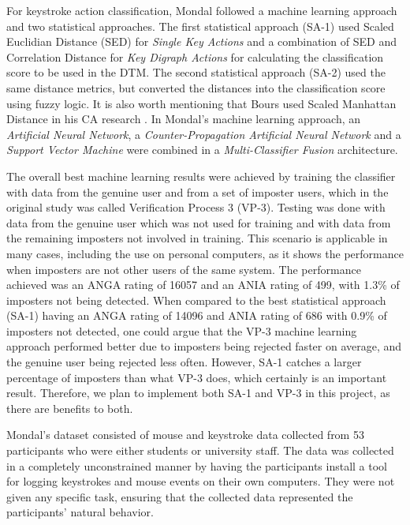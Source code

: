 \documentclass[informationsecurity]{gucmasterproject}
\begin{document}
For keystroke action classification, Mondal followed a machine learning approach and two statistical approaches.
The first statistical approach (SA-1) used Scaled Euclidian Distance (SED) for \textit{Single Key Actions} and a combination of SED and Correlation Distance for \textit{Key Digraph Actions} for calculating the classification score to be used in the DTM. 
The second statistical approach (SA-2) used the same distance metrics, but converted the distances into the classification score using fuzzy logic.
It is also worth mentioning that Bours used Scaled Manhattan Distance in his CA research \cite{BOURS201236}.
In Mondal's \cite{mondal} machine learning approach, an \textit{Artificial Neural Network}, a \textit{Counter-Propagation Artificial Neural Network} and a \textit{Support Vector Machine} were combined in a \textit{Multi-Classifier Fusion} architecture. 

The overall best machine learning results were achieved by training the classifier with data from the genuine user and from a set of imposter users, which in the original study \cite{mondal} was called Verification Process 3 (VP-3).
Testing was done with data from the genuine user which was not used for training and with data from the remaining imposters not involved in training.
This scenario is applicable in many cases, including the use on personal computers, as it shows the performance when imposters are not other users of the same system.
The performance achieved was an ANGA rating of 16057 and an ANIA rating of 499, with 1.3\% of imposters not being detected.
When compared to the best statistical approach (SA-1) having an ANGA rating of 14096 and ANIA rating of 686 with 0.9\% of imposters not detected, one could argue that the VP-3 machine learning approach performed better due to imposters being rejected faster on average, and the genuine user being rejected less often.
However, SA-1 catches a larger percentage of imposters than what VP-3 does, which certainly is an important result.
Therefore, we plan to implement both SA-1 and VP-3 in this project, as there are benefits to both.

Mondal's dataset consisted of mouse and keystroke data collected from 53 participants who were either students or university staff.
The data was collected in a completely unconstrained manner by having the participants install a tool for logging keystrokes and mouse events on their own computers.
They were not given any specific task, ensuring that the collected data represented the participants' natural behavior.
\end{document}
